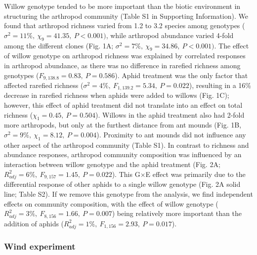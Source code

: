 \documentclass[11pt]{article}
\begin{document}
Willow genotype tended to be more important than the biotic environment
in structuring the arthropod community (Table S1 in Supporting
Information). We found that arthropod richness varied from 1.2 to 3.2
species among genotypes (\(\sigma^2=11\%,\ \chi_9=41.35,\ P<0.001)\), while arthropod abundance
varied 4-fold among the different clones (Fig. 1A; \(\sigma^2=7\%,\ \chi_9=34.86,\ P<0.001)\).
The effect of willow genotype on arthropod richness was explained by
correlated responses in arthropod abundance, as there was no difference
in rarefied richness among genotypes (\(F_{9,138.8}=0.83,\ P=0.586\)). Aphid
treatment was the only factor that affected rarefied richness
(\(\)\(\sigma^2=4\%,\ F_{1,139.2}=5.34,\ P=0.022\)), resulting in a 16\% decrease in
rarefied richness when aphids were added to willows (Fig. 1C); however,
this effect of aphid treatment did not translate into an effect on total
richness (\(\chi_1=0.45,\ P=0.504\)). Willows in the aphid treatment also had
2-fold more arthropods, but only at the furthest distance from ant
mounds (Fig. 1B, \(\sigma^2=9\%,\ \chi_1=8.12,\ P=0.004\)). Proximity to ant mounds did not
influence any other aspect of the arthropod community (Table S1). In
contrast to richness and abundance responses, arthropod community
composition was influenced by an interaction between willow genotype and
the aphid treatment (Fig. 2A; \(R_{adj}^2=6\%,\ F_{9,157}=1.45,\ P=0.022\)). This
G\(\times\)E effect was primarily due to the differential
response of other aphids to a single willow genotype (Fig. 2A solid
line; Table S2). If we remove this genotype from the analysis, we find
independent effects on community composition, with the effect of willow
genotype (\(R_{adj}^2=3\%,\ F_{8,156}=1.66,\ P=0.007\)) being relatively more important than the
addition of aphids (\(R_{adj}^2=1\%,\ F_{1,156}=2.93,\ P=0.017\)).


\subsubsection*{Wind experiment}
\end{document}
